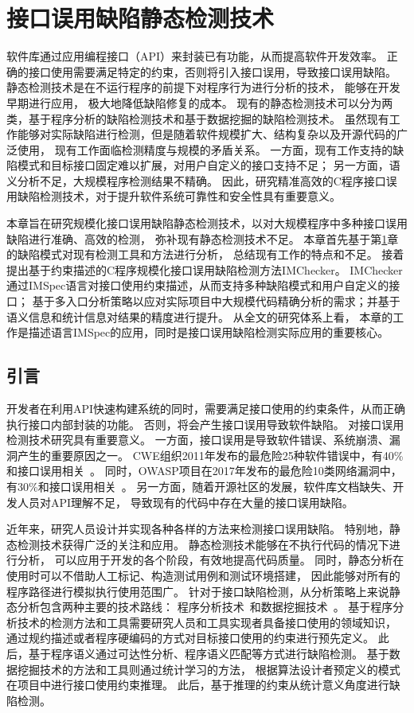 \chapter{接口误用缺陷静态检测技术}
\label{cha:imchecker}
软件库通过应用编程接口（API）来封装已有功能，从而提高软件开发效率。
正确的接口使用需要满足特定的约束，否则将引入接口误用，导致接口误用缺陷。
静态检测技术是在不运行程序的前提下对程序行为进行分析的技术，
能够在开发早期进行应用，
极大地降低缺陷修复的成本。
现有的静态检测技术可以分为两类，基于程序分析的缺陷检测技术和基于数据挖掘的缺陷检测技术。
虽然现有工作能够对实际缺陷进行检测，但是随着软件规模扩大、结构复杂以及开源代码的广泛使用，
现有工作面临检测精度与规模的矛盾关系。
一方面，现有工作支持的缺陷模式和目标接口固定难以扩展，对用户自定义的接口支持不足；
另一方面，语义分析不足，大规模程序检测结果不精确。
因此，研究精准高效的C程序接口误用缺陷检测技术，对于提升软件系统可靠性和安全性具有重要意义。

本章旨在研究规模化接口误用缺陷静态检测技术，以对大规模程序中多种接口误用缺陷进行准确、高效的检测，
弥补现有静态检测技术不足。
本章首先基于第\ref{cha:imchecker}章的缺陷模式对现有检测工具和方法进行分析，
总结现有工作的特点和不足。
接着提出基于约束描述的C程序规模化接口误用缺陷检测方法IMChecker。
IMChecker通过IMSpec语言对接口使用约束描述，从而支持多种缺陷模式和用户自定义的接口；
基于多入口分析策略以应对实际项目中大规模代码精确分析的需求；并基于语义信息和统计信息对结果的精度进行提升。
从全文的研究体系上看，
本章的工作是描述语言IMSpec的应用，同时是接口误用缺陷检测实际应用的重要核心。

\section{引言}
开发者在利用API快速构建系统的同时，需要满足接口使用的约束条件，从而正确执行接口内部封装的功能。
否则，将会产生接口误用导致软件缺陷。
对接口误用检测技术研究具有重要意义。
一方面，接口误用是导致软件错误、系统崩溃、漏洞产生的重要原因之一。
CWE组织2011年发布的最危险25种软件错误中，有40\%和接口误用相关~\cite{cwe-top25}。
同时，OWASP项目在2017年发布的最危险10类网络漏洞中，有30\%和接口误用相关~\cite{owasp-top10}。
另一方面，随着开源社区的发展，软件库文档缺失、开发人员对API理解不足，
导致现有的代码中存在大量的接口误用缺陷。

近年来，研究人员设计并实现各种各样的方法来检测接口误用缺陷。
特别地，静态检测技术获得广泛的关注和应用。
静态检测技术能够在不执行代码的情况下进行分析，
可以应用于开发的各个阶段，有效地提高代码质量。
同时，静态分析在使用时可以不借助人工标记、构造测试用例和测试环境搭建，
因此能够对所有的程序路径进行模拟执行使用范围广。
针对于接口缺陷检测，从分析策略上来说静态分析包含两种主要的技术路线：
程序分析技术~\cite{16-saner-evaluation}和数据挖掘技术~\cite{survey18}。
基于程序分析技术的检测方法和工具需要研究人员和工具实现者具备接口使用的领域知识，
通过规约描述或者程序硬编码的方式对目标接口使用的约束进行预先定义。
此后，基于程序语义通过可达性分析、程序语义匹配等方式进行缺陷检测。
基于数据挖掘技术的方法和工具则通过统计学习的方法，
根据算法设计者预定义的模式在项目中进行接口使用约束推理。
此后，基于推理的约束从统计意义角度进行缺陷检测。

